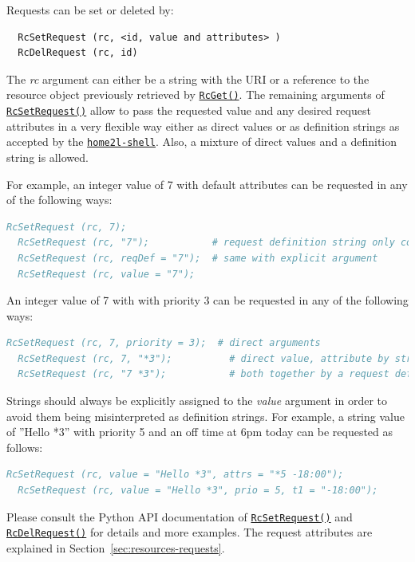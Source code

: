 \documentclass[12pt,english,parskip=half,headheight=19pt]{scrreprt}
\newcommand{\idx}[1]{#1\index{#1}}
\newcommand{\reftool}[1]{\hyperref[tool:#1]{\texttt{\idx{#1}}}}
\newcommand{\refapic}[1]{\href{home2l-api_c/index.html}{\mbox{\texttt{#1}}}}            %
\newcommand{\refapipython}[1]{\href{home2l-api_python/index.html}{\mbox{\texttt{#1}}}}  %
\begin{document}
Requests can be set or deleted by:
\begin{lstlisting}
  RcSetRequest (rc, <id, value and attributes> )
  RcDelRequest (rc, id)
\end{lstlisting}

The \textit{rc} argument can either be a string with the URI or a reference to the resource object previously retrieved by \refapipython{RcGet()}. The remaining arguments of \refapipython{RcSetRequest()} allow to pass the requested value and any desired request attributes in a very flexible way either as direct values or as definition strings as accepted by the \reftool{home2l-shell}. Also, a mixture of direct values and a definition string is allowed.

For example, an integer value of 7 with default attributes can be requested in any of the following ways:
\begin{lstlisting}[language=comments]
  RcSetRequest (rc, 7);
  RcSetRequest (rc, "7");           # request definition string only containing the value
  RcSetRequest (rc, reqDef = "7");  # same with explicit argument
  RcSetRequest (rc, value = "7");
\end{lstlisting}

An integer value of 7 with with priority 3 can be requested in any of the following ways:
\begin{lstlisting}[language=comments]
  RcSetRequest (rc, 7, priority = 3);  # direct arguments
  RcSetRequest (rc, 7, "*3");          # direct value, attribute by string
  RcSetRequest (rc, "7 *3");           # both together by a request definition string
\end{lstlisting}

Strings should always be explicitly assigned to the \textit{value} argument in order to avoid them being misinterpreted as definition strings. For example, a string value of ''Hello *3'' with priority 5 and an off time at 6pm today can be requested as follows:
\begin{lstlisting}[language=comments]
  RcSetRequest (rc, value = "Hello *3", attrs = "*5 -18:00");
  RcSetRequest (rc, value = "Hello *3", prio = 5, t1 = "-18:00");
\end{lstlisting}

Please consult the Python API documentation of \refapipython{RcSetRequest()} and \refapic{RcDelRequest()} for details and more examples. The request attributes are explained in Section~\ref{sec:resources-requests}.
\end{document}
